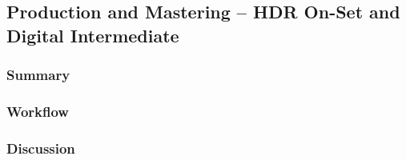\subsection{Production and Mastering -- HDR On-Set and Digital Intermediate} \label{subsec:tv-onset-di-hdr}

	\subsubsection{Summary}
	
	\lipsum[1] %
	
	\subsubsection{Workflow}
	
	\lipsum[1] %
	
	\subsubsection{Discussion}
	
	\lipsum[1] %